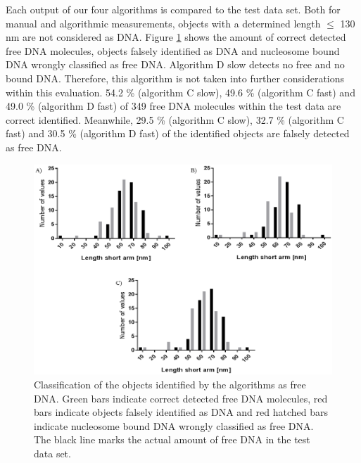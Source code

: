 \documentclass{article}
\begin{document}
Each output of our four algorithms is compared to the test data set. Both for manual and algorithmic measurements, objects with a determined length $\leq$ 130 nm are not considered as DNA. Figure \ref{fig: validation2} shows the amount of correct detected free DNA molecules, objects falsely identified as DNA and nucleosome bound DNA wrongly classified as free DNA. Algorithm D slow detects no free and no bound DNA. Therefore, this algorithm is not taken into further considerations within this evaluation. 54.2 \% (algorithm C slow), 49.6 \% (algorithm C fast) and 49.0 \% (algorithm D fast) of 349 free DNA molecules within the test data are correct identified. Meanwhile, 29.5 \% (algorithm C slow), 32.7 \% (algorithm C fast) and 30.5 \% (algorithm D fast) of the identified objects are falsely detected as free DNA.
%
\begin{figure}[!htb]
	\begin{center}
		\includegraphics[width = 0.9 \textwidth]{validation2}
	\end{center}
	\caption{Classification of the objects identified by the algorithms as free DNA. Green bars indicate correct detected free DNA molecules, red bars indicate objects falsely identified as DNA and red hatched bars indicate nucleosome bound DNA wrongly classified as free DNA. The black line marks the actual amount of free DNA in the test data set.}
	\label{fig: validation2} %
\end{figure}
\end{document}

